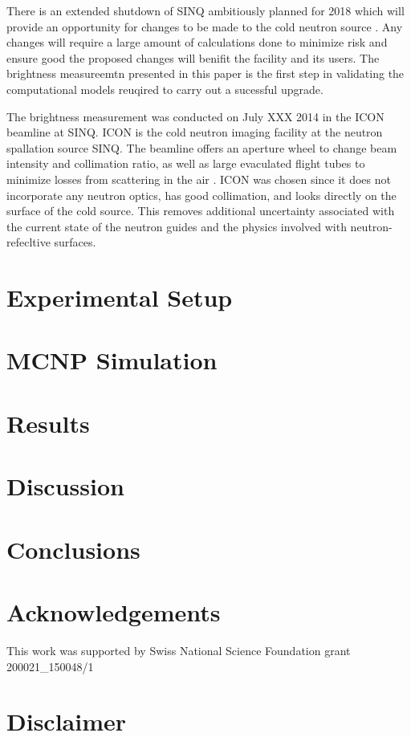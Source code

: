 \documentclass[preprint,12pt]{elsarticle}
\begin{document}
There is an extended shutdown of SINQ ambitiously planned for 2018 which will provide an opportunity for changes to be made to the cold neutron source \cite{rueegg_icans}.  Any changes will require a large amount of calculations done to minimize risk and ensure good the proposed changes will benifit the facility and its users.  The brightness measureemtn presented in this paper is the first step in validating the computational models reuqired to carry out a sucessful upgrade.  

The brightness measurement was conducted on July XXX 2014 in the ICON beamline at SINQ.  ICON is the cold neutron imaging facility at the neutron spallation source SINQ. The beamline offers an aperture wheel to change beam intensity and collimation ratio, as well as large evaculated flight tubes to minimize losses from scattering in the air \cite{icon}.  ICON was chosen since it does not incorporate any neutron optics, has good collimation, and looks directly on the surface of the cold source.  This removes additional uncertainty associated with the current state of the neutron guides and the physics involved with neutron-refecltive surfaces.

\section{Experimental Setup}
\label{sec:setup}



\section{MCNP Simulation}
\label{sec:sim}



\section{Results}
\label{sec:results}



\section{Discussion}
\label{sec:discussion}



\section{Conclusions}
\label{sec:conclusions}



\section*{Acknowledgements}
\label{sec:ack}

This work was supported by Swiss National Science Foundation grant 200021\_150048/1

\section*{Disclaimer}
\label{sec:disc}



\end{document}
